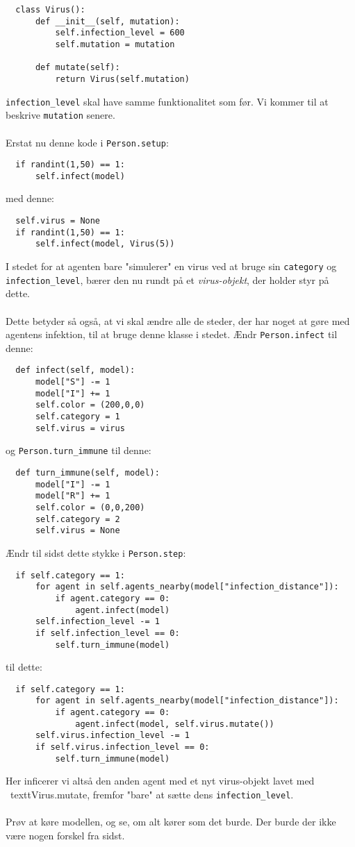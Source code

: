 \documentclass{article}
\begin{document}
\begin{lstlisting}
  class Virus():
      def __init__(self, mutation):
          self.infection_level = 600
          self.mutation = mutation

      def mutate(self):
          return Virus(self.mutation)
\end{lstlisting}
\texttt{infection\_level} skal have samme funktionalitet som før. Vi kommer til at beskrive \texttt{mutation} senere.\\\\
Erstat nu denne kode i \texttt{Person.setup}:
\begin{lstlisting}
  if randint(1,50) == 1:
      self.infect(model)
\end{lstlisting}
med denne:
\begin{lstlisting}
  self.virus = None
  if randint(1,50) == 1:
      self.infect(model, Virus(5))
\end{lstlisting}
I stedet for at agenten bare "simulerer" en virus ved at bruge sin \texttt{category} og \texttt{infection\_level}, bærer den nu rundt på et \textit{virus-objekt}, der holder styr på dette.\\\\
Dette betyder så også, at vi skal ændre alle de steder, der har noget at gøre med agentens infektion, til at bruge denne klasse i stedet. Ændr \texttt{Person.infect} til denne:
\begin{lstlisting}
  def infect(self, model):
      model["S"] -= 1
      model["I"] += 1
      self.color = (200,0,0)
      self.category = 1
      self.virus = virus
\end{lstlisting}
og \texttt{Person.turn\_immune} til denne:
\begin{lstlisting}
  def turn_immune(self, model):
      model["I"] -= 1
      model["R"] += 1
      self.color = (0,0,200)
      self.category = 2
      self.virus = None
\end{lstlisting}
Ændr til sidst dette stykke i \texttt{Person.step}:
\begin{lstlisting}
  if self.category == 1:
      for agent in self.agents_nearby(model["infection_distance"]):
          if agent.category == 0:
              agent.infect(model)
      self.infection_level -= 1
      if self.infection_level == 0:
          self.turn_immune(model)
\end{lstlisting}
til dette:
\begin{lstlisting}
  if self.category == 1:
      for agent in self.agents_nearby(model["infection_distance"]):
          if agent.category == 0:
              agent.infect(model, self.virus.mutate())
      self.virus.infection_level -= 1
      if self.virus.infection_level == 0:
          self.turn_immune(model)
\end{lstlisting}
Her inficerer vi altså den anden agent med et nyt virus-objekt lavet med \ textt{Virus.mutate}, fremfor "bare" at sætte dens \texttt{infection\_level}.\\\\
Prøv at køre modellen, og se, om alt kører som det burde. Der burde der ikke være nogen forskel fra sidst.
\end{document}
